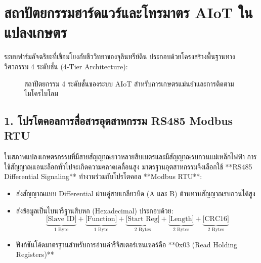 \section{สถาปัตยกรรมฮาร์ดแวร์และโทรมาตร AIoT ในแปลงเกษตร}

ระบบฟาร์มอัจฉริยะที่เชื่อมโยงกับชีววิทยาของจุลินทรีย์ดิน ประกอบด้วยโครงสร้างพื้นฐานทางวิศวกรรม 4 ระดับชั้น (4-Tier Architecture):

\begin{figure}[ht]
\centering
{}
\caption{สถาปัตยกรรม 4 ระดับชั้นของระบบ AIoT สำหรับการเกษตรแม่นยำและการติดตามไมโครไบโอม}
\label{fig:aiot_4tier}
\end{figure}

\subsection{1. โปรโตคอลการสื่อสารอุตสาหกรรม RS485 Modbus RTU}
ในสภาพแปลงเกษตรกรรมที่มีสายสัญญาณยาวหลายสิบเมตรและมีสัญญาณรบกวนแม่เหล็กไฟฟ้า การใช้สัญญาณแอนะล็อกทั่วไปจะเกิดความคลาดเคลื่อนสูง มาตรฐานอุตสาหกรรมจึงเลือกใช้ **RS485 Differential Signaling** ทำงานร่วมกับโปรโตคอล **Modbus RTU**:
\begin{itemize}
    \item ส่งสัญญาณแบบ Differential ผ่านคู่สายเกลียวบิด (A และ B) ต้านทานสัญญาณรบกวนได้สูง
    \item ส่งข้อมูลเป็นไบนารีฐานสิบหก (Hexadecimal) ประกอบด้วย:
    $$\underbrace{\text{[Slave ID]}}_{1\text{ Byte}} + \underbrace{\text{[Function]}}_{1\text{ Byte}} + \underbrace{\text{[Start Reg]}}_{2\text{ Bytes}} + \underbrace{\text{[Length]}}_{2\text{ Bytes}} + \underbrace{\text{[CRC16]}}_{2\text{ Bytes}}$$
    \item ฟังก์ชันโค้ดมาตรฐานสำหรับการอ่านค่ารีจิสเตอร์เซนเซอร์คือ **0x03 (Read Holding Registers)**
\end{itemize}

